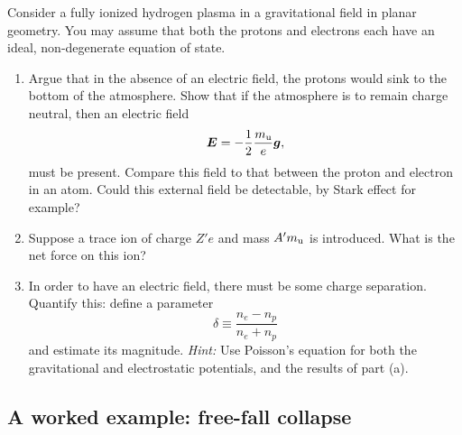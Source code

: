 \begin{exercisebox}
Consider a fully ionized hydrogen plasma in a gravitational field in planar geometry.  You may assume that both the protons and electrons each have an ideal, non-degenerate equation of state.
\begin{enumerate}
\item Argue that in the absence of an electric field, the protons would sink to the bottom of the atmosphere. Show that if the atmosphere is to remain charge neutral, then an electric field
\[
	\boldsymbol{E} = -\frac{1}{2}\frac{m_\mathrm{u}}{e}\boldsymbol{g},
\]
must be present. Compare this field to that between the proton and electron in an atom.  Could this external field be detectable, by Stark effect for example?

\item Suppose a trace ion of charge $Z'e$ and mass $A'm_\mathrm{u}$ is	 introduced.  What is the net force on this ion?

\item In order to have an electric field, there must be some charge separation.  Quantify this: define a parameter
\[ \delta \equiv \frac{n_{e}-n_{p}}{n_{e} + n_{p}} \]
and estimate its magnitude.  \emph{Hint:} Use Poisson's equation for both the gravitational and electrostatic potentials, and the results of part (a).
\end{enumerate}
\end{exercisebox}

\subsection{A worked example: free-fall collapse}


